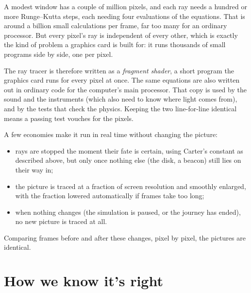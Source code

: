 \documentclass[11pt,a4paper]{article}
\begin{document}
A modest window has a couple of million pixels, and each ray needs a hundred or more
Runge--Kutta steps, each needing four evaluations of the equations. That is around a
billion small calculations per frame, far too many for an ordinary processor. But every
pixel's ray is independent of every other, which is exactly the kind of problem a graphics
card is built for: it runs thousands of small programs side by side, one per pixel.

The ray tracer is therefore written as a \emph{fragment shader}, a short program the
graphics card runs for every pixel at once. The same equations are also written out in
ordinary code for the computer's main processor. That copy is used by the sound and the
instruments (which also need to know where light comes from), and by the tests that check
the physics. Keeping the two line-for-line identical means a passing test vouches for the
pixels.

A few economies make it run in real time without changing the picture:
\begin{itemize}
  \item rays are stopped the moment their fate is certain, using Carter's constant as
        described above, but only once nothing else (the disk, a beacon) still lies on
        their way in;
  \item the picture is traced at a fraction of screen resolution and smoothly enlarged,
        with the fraction lowered automatically if frames take too long;
  \item when nothing changes (the simulation is paused, or the journey has ended), no new
        picture is traced at all.
\end{itemize}
Comparing frames before and after these changes, pixel by pixel, the pictures are
identical.

\section{How we know it's right}
\end{document}
